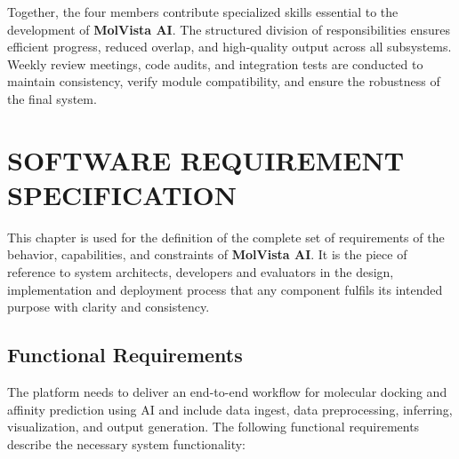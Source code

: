 \documentclass[12pt,a4]{report}
\begin{document}
\vspace{0.3cm}

Together, the four members contribute specialized skills essential to the development of \textbf{MolVista AI}. The structured division of responsibilities ensures efficient progress, reduced overlap, and high-quality output across all subsystems. Weekly review meetings, code audits, and integration tests are conducted to maintain consistency, verify module compatibility, and ensure the robustness of the final system.


\chapter{SOFTWARE REQUIREMENT \vspace*{0.5\baselineskip} SPECIFICATION}

\hspace{0.3in}This chapter is used for the definition of the complete set of requirements of the behavior, capabilities, and constraints of \textbf{MolVista AI}. It is the piece of reference to system architects, developers and evaluators in the design, implementation and deployment process that any component fulfils its intended purpose with clarity and consistency.

\section{Functional Requirements}

\hspace{0.3in}The platform needs to deliver an end-to-end workflow for molecular docking and affinity prediction using AI and include data ingest, data preprocessing, inferring, visualization, and output generation. The following functional requirements describe the necessary system functionality:
\end{document}
